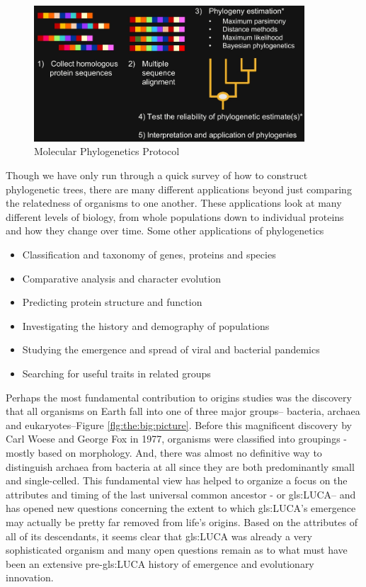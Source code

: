 \documentclass[]{article}
\begin{document}
\begin{figure}[H]
	\caption{Molecular Phylogenetics Protocol}\label{fig:MolecularPhylogeneticsProtocol}
	\includegraphics[width=0.9\textwidth]{MolecularPhylogeneticsProtocol}
\end{figure}
Though we have only run through
a quick survey
of how to construct phylogenetic trees,
there are many different applications
beyond just comparing the relatedness
of organisms to one another.
These applications look at
many different levels of biology,
from whole populations
down to individual proteins
and how they change over time.
Some other applications of phylogenetics
\begin{itemize}
	\item Classification and taxonomy of genes, proteins and species
	\item Comparative analysis and character evolution
	\item Predicting protein structure and function
	\item Investigating the history and demography of populations
	\item Studying the emergence and spread of viral and bacterial pandemics
	\item Searching for useful traits in related groups
\end{itemize}

Perhaps the most fundamental
contribution to origins studies
was the discovery that
all organisms on Earth
fall into one of three major groups--
bacteria, archaea and eukaryotes--Figure \ref{flg:the:big:picture}.
Before this magnificent discovery
by Carl Woese and George Fox in 1977,
organisms were classified into groupings -
mostly based on morphology.
And, there was almost no definitive way
to distinguish archaea
from bacteria at all
since they are both predominantly
small and single-celled.
This fundamental view
has helped to organize a focus
on the attributes and timing
of the last universal common ancestor -
or \gls{gls:LUCA}--
and has opened new questions
concerning the extent to which
\gls{gls:LUCA}'s emergence may actually be
pretty far removed from life's origins.
Based on the attributes
of all of its descendants,
it seems clear that \gls{gls:LUCA} was already
a very sophisticated organism
and many open questions remain
as to what must have been
an extensive pre-\gls{gls:LUCA} history
of emergence and evolutionary innovation.
\end{document}
